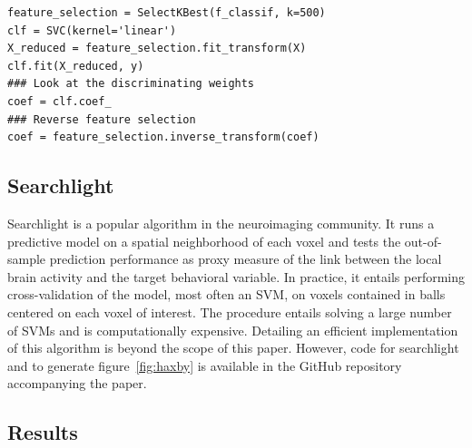 \documentclass{frontiersSCNS} %
\begin{document}
\begin{lstlisting}
feature_selection = SelectKBest(f_classif, k=500)
clf = SVC(kernel='linear')
X_reduced = feature_selection.fit_transform(X)
clf.fit(X_reduced, y)
### Look at the discriminating weights
coef = clf.coef_
### Reverse feature selection
coef = feature_selection.inverse_transform(coef)
\end{lstlisting}

\subsection{Searchlight}
\label{searchlight}

Searchlight \citep{kriegeskorte2006} is a popular algorithm in the
neuroimaging community. It runs a predictive model on a spatial
neighborhood of each voxel and tests the out-of-sample prediction
performance as proxy measure of the link between the local brain activity
and the target behavioral variable. In practice, it entails performing
cross-validation of the model, most often an SVM, on voxels contained in
balls centered on each voxel of interest. The procedure entails 
solving a large number of SVMs and is computationally expensive.
Detailing an efficient implementation of this algorithm is beyond the
scope of this paper. However, code for searchlight and to generate
figure~\ref{fig:haxby}
is available in the GitHub repository accompanying the paper.

\subsection{Results}
\end{document}
